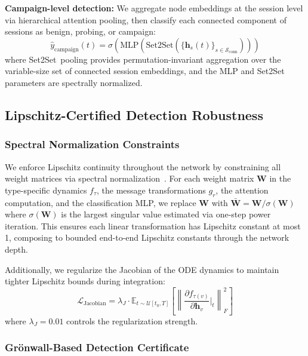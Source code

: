 \documentclass[journal]{IEEEtran}
\newcommand{\E}{\mathbb{E}}
\newcommand{\calL}{\mathcal{L}}
\newcommand{\calS}{\mathcal{S}}
\theoremstyle{plain}
\theoremstyle{definition}
\theoremstyle{remark}
\begin{document}
\textbf{Campaign-level detection:} We aggregate node embeddings at the session level via hierarchical attention pooling, then classify each connected component of sessions as benign, probing, or campaign:
\begin{equation}
\hat{y}_{\text{campaign}}(t) = \sigma\!\left(\text{MLP}\!\left(\text{Set2Set}\!\left(\{\mathbf{h}_s(t)\}_{s \in \calS_{\text{conn}}}\right)\right)\right)
\end{equation}
where Set2Set~pooling provides permutation-invariant aggregation over the variable-size set of connected session embeddings, and the MLP and Set2Set parameters are spectrally normalized.

\subsection{Lipschitz-Certified Detection Robustness}
\label{sec:lipschitz}

\subsubsection{Spectral Normalization Constraints}

We enforce Lipschitz continuity throughout the network by constraining all weight matrices via spectral normalization~\cite{miyato2018spectral}. For each weight matrix $\mathbf{W}$ in the type-specific dynamics $f_{\tau}$, the message transformations $g_r$, the attention computation, and the classification MLP, we replace $\mathbf{W}$ with $\bar{\mathbf{W}} = \mathbf{W} / \sigma(\mathbf{W})$ where $\sigma(\mathbf{W})$ is the largest singular value estimated via one-step power iteration. This ensures each linear transformation has Lipschitz constant at most 1, composing to bounded end-to-end Lipschitz constants through the network depth.

Additionally, we regularize the Jacobian of the ODE dynamics to maintain tighter Lipschitz bounds during integration:
\begin{equation}
\calL_{\text{Jacobian}} = \lambda_J \cdot \E_{t \sim \mathcal{U}[t_0, T]} \left[\left\|\frac{\partial f_{\tau(v)}}{\partial \mathbf{h}_v}\bigg|_t\right\|_F^2\right]
\end{equation}
where $\lambda_J = 0.01$ controls the regularization strength.

\subsubsection{Gr\"onwall-Based Detection Certificate}
\end{document}
